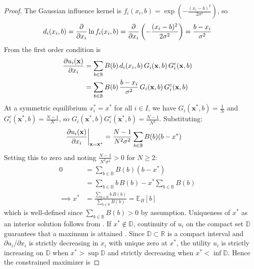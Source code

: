 \documentclass{article}
\begin{document}
            \begin{proof}
                The Gaussian influence kernel is $f_i(x_i,b) = \exp\left(-\frac{(x_i-b)^2}{2\sigma^2}\right)$, so
                \begin{equation}
                    d_i(x_i,b) = \pdv{}{x_i}\ln f_i(x_i,b) = 
                    \pdv{}{x_i}\left(-\frac{(x_i-b)^2}{2\sigma^2}\right) = 
                    \frac{b-x_i}{\sigma^2}
                \end{equation}
                From  the first order condition is
                \begin{align}
                    \pdv{u_i(\mathbf{x})}{x_i} &= \sum_{b\in\mathbb{B}} B(b)\, 
                    d_i(x_i,b)\, G_i(\mathbf{x},b)\, G_i^c(\mathbf{x},b) \\
                    &= \sum_{b\in\mathbb{B}} B(b)\, \frac{b-x_i}{\sigma^2}\, 
                    G_i(\mathbf{x},b)\, G_i^c(\mathbf{x},b)
                \end{align}
                At a symmetric equilibrium $x_i^* = x^*$ for all $i \in I$, we have $G_i(\mathbf{x}^*,b) = \frac{1}{N}$ and $G_i^c(\mathbf{x}^*,b) = \frac{N-1}{N}$, so $G_i(\mathbf{x}^*,b)G_i^c(\mathbf{x}^*,b) = \frac{N-1}{N^2}$. Substituting:
                \begin{align}
                    \pdv{u_i(\mathbf{x})}{x_i}\bigg|_{\mathbf{x}=\mathbf{x}^*} 
                    &= \frac{N-1}{N^2\sigma^2}\sum_{b\in\mathbb{B}} B(b)(b - x^*)
                \end{align}
                Setting this to zero and noting $\frac{N-1}{N^2\sigma^2} > 0$ for $N \geq 2$:
                \begin{align}
                    0 &= \sum_{b\in\mathbb{B}} B(b)(b - x^*) \\
                    &= \sum_{b\in\mathbb{B}} b\, B(b) - x^* \sum_{b\in\mathbb{B}} B(b) \\
                    \implies x^* &= \frac{\sum_{b\in\mathbb{B}} b\, B(b)}
                    {\sum_{b\in\mathbb{B}} B(b)} = \mathbb{E}_B[b]
                \end{align}
                which is well-defined since $\sum_{b\in\mathbb{B}} B(b) > 0$ by assumption. Uniqueness of $x^*$ as an interior solution follows from . If $x^* \notin \mathbb{D}$, continuity of $u_i$ on the compact set $\mathbb{D}$ guarantees that a maximum is attained \cite[Thm.~4.16]{rudin1976principles}. Since $\mathbb{D} \subset \mathbb{R}$ is a compact interval and $\partial u_i / \partial x_i$ is strictly decreasing in $x_i$ with unique zero at $x^*$, the utility $u_i$ is strictly increasing on $\mathbb{D}$ when $x^* > \sup\mathbb{D}$ and strictly decreasing when $x^* < \inf\mathbb{D}$. Hence the constrained maximizer is

\end{proof}
\end{document}
